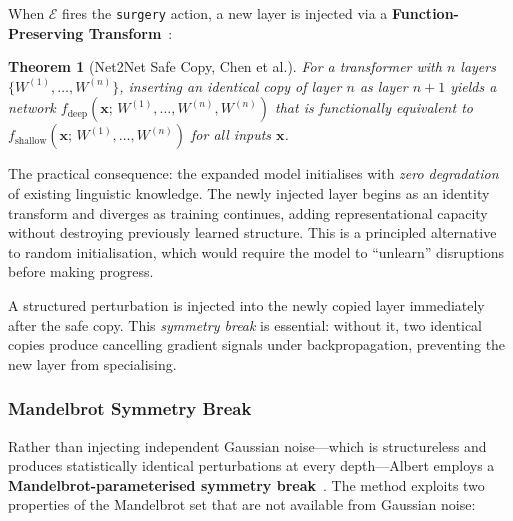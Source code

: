 \documentclass[journal,10pt,twocolumn]{IEEEtran}
\newtheorem{theorem}{Theorem}
\begin{document}
When $\mathcal{E}$ fires the \texttt{surgery} action, a new layer is injected
via a \textbf{Function-Preserving Transform}~\cite{tis2026trainbible}:

\begin{theorem}[Net2Net Safe Copy, Chen et al.]
For a transformer with $n$ layers $\{W^{(1)},\ldots,W^{(n)}\}$,
inserting an identical copy of layer $n$ as layer $n+1$ yields a network
$f_\text{deep}(\mathbf{x};\, W^{(1)},\ldots,W^{(n)},W^{(n)})$ that is
functionally equivalent to $f_\text{shallow}(\mathbf{x};\, W^{(1)},\ldots,W^{(n)})$
for all inputs $\mathbf{x}$.
\end{theorem}

\noindent The practical consequence: the expanded model initialises with
\emph{zero degradation} of existing linguistic knowledge. The newly injected
layer begins as an identity transform and diverges as training continues,
adding representational capacity without destroying previously learned
structure. This is a principled alternative to random initialisation, which
would require the model to ``unlearn'' disruptions before making progress.

A structured perturbation is injected into the newly copied layer immediately
after the safe copy. This \emph{symmetry break} is essential: without it, two
identical copies produce cancelling gradient signals under backpropagation,
preventing the new layer from specialising.

\subsubsection{Mandelbrot Symmetry Break}
\label{subsubsec:mandelbrot}

Rather than injecting independent Gaussian noise---which is structureless and
produces statistically identical perturbations at every depth---Albert employs
a \textbf{Mandelbrot-parameterised symmetry break}~\cite{tis2026trainbible}. The method exploits two
properties of the Mandelbrot set that are not available from Gaussian noise:
\end{document}
